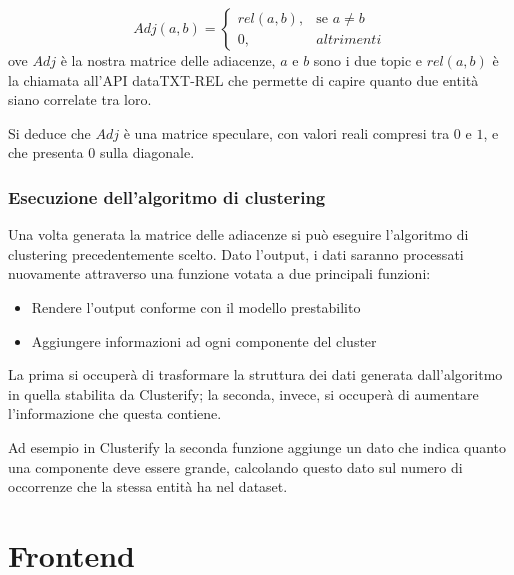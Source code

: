 			\begin{equation*}
				Adj(a, b) = \begin{cases} 
					rel(a,b), & \mbox{se } a \neq b \\ 
					0, & altrimenti 
				\end{cases}
			\end{equation*}
			ove $Adj$ è la nostra matrice delle adiacenze, $a$ e $b$ sono i due topic e $rel(a,b)$ è la chiamata all'API dataTXT-REL che permette di capire quanto due entità siano correlate tra loro.
			
			Si deduce che $Adj$ è una matrice speculare, con valori reali compresi tra $0$ e $1$, e che presenta $0$ sulla diagonale.

		\subsubsection{Esecuzione dell'algoritmo di clustering}
			Una volta generata la matrice delle adiacenze si può eseguire l'algoritmo di clustering precedentemente scelto. Dato l'output, i dati saranno processati nuovamente attraverso una funzione votata a due principali funzioni:
			\begin{itemize}
  				\item Rendere l'output conforme con il modello prestabilito
	  			\item Aggiungere informazioni ad ogni componente del cluster
 			\end{itemize} 
			
			La prima si occuperà di trasformare la struttura dei dati generata dall'algoritmo in quella stabilita da Clusterify; la seconda, invece, si occuperà di aumentare l'informazione che questa contiene.

			Ad esempio in Clusterify la seconda funzione aggiunge un dato che indica quanto una componente deve essere grande, calcolando questo dato sul numero di occorrenze che la stessa entità ha nel dataset.

\section{Frontend}
	
